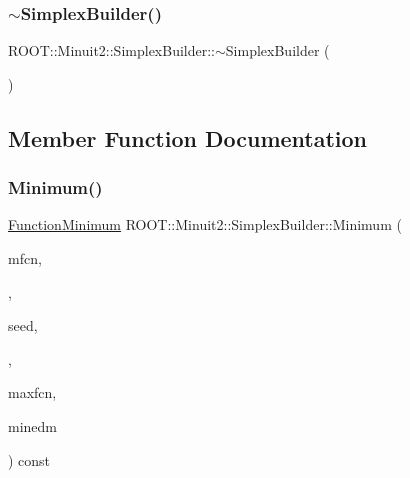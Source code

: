 \mbox{\label{classROOT_1_1Minuit2_1_1SimplexBuilder_a2559aceabff61d3361e5750aa6b97f73}} 
\subsubsection{\texorpdfstring{$\sim$SimplexBuilder()}{~SimplexBuilder()}\hspace{0.1cm}{\footnotesize\ttfamily [2/2]}}
{\footnotesize\ttfamily R\+O\+O\+T\+::\+Minuit2\+::\+Simplex\+Builder\+::$\sim$\+Simplex\+Builder (\begin{DoxyParamCaption}{ }\end{DoxyParamCaption})\hspace{0.3cm}{\ttfamily [inline]}}



\subsection{Member Function Documentation}
\mbox{\label{classROOT_1_1Minuit2_1_1SimplexBuilder_a82c52765929e3f4a41b1abe1473d4140}} 
\subsubsection{\texorpdfstring{Minimum()}{Minimum()}\hspace{0.1cm}{\footnotesize\ttfamily [1/2]}}
{\footnotesize\ttfamily \mbox{\hyperlink{classROOT_1_1Minuit2_1_1FunctionMinimum}{Function\+Minimum}} R\+O\+O\+T\+::\+Minuit2\+::\+Simplex\+Builder\+::\+Minimum (\begin{DoxyParamCaption}\item[{const \mbox{\hyperlink{classROOT_1_1Minuit2_1_1MnFcn}{Mn\+Fcn}} \&}]{mfcn,  }\item[{const \mbox{\hyperlink{classROOT_1_1Minuit2_1_1GradientCalculator}{Gradient\+Calculator}} \&}]{,  }\item[{const \mbox{\hyperlink{classROOT_1_1Minuit2_1_1MinimumSeed}{Minimum\+Seed}} \&}]{seed,  }\item[{const \mbox{\hyperlink{classROOT_1_1Minuit2_1_1MnStrategy}{Mn\+Strategy}} \&}]{,  }\item[{unsigned int}]{maxfcn,  }\item[{double}]{minedm }\end{DoxyParamCaption}) const\hspace{0.3cm}{\ttfamily [virtual]}}



